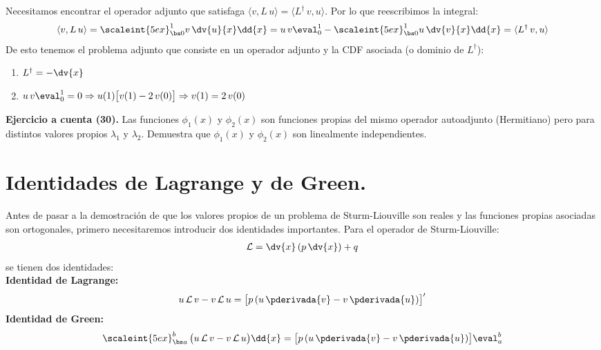 Necesitamos encontrar el operador adjunto que satisfaga \hfill \break $\langle v, L \, u \rangle = \langle L^{\dagger} \, v, u \rangle$. Por lo que reescribimos la integral:
\begin{align*}
\langle v, L \, u \rangle = \scaleint{5ex}_{\bs 0}^{1} v \, \dv{u}{x} \dd{x} = u \, v \eval_{0}^{1} - \scaleint{5ex}_{\bs 0}^{1} u \, \dv{v}{x} \dd{x} = \langle L^{\dagger} \, v, u \rangle
\end{align*}
De esto tenemos el problema adjunto que consiste en un operador adjunto y la CDF asociada (o dominio de $L^{\dagger}$):
\begin{enumerate}
\item $L^{\dagger} = - \dv{x}$
\item $\displaystyle u \, v \eval_{0}^{1} = 0 \Rightarrow u(1) \big[ v(1) - 2 \, v(0) \big] \Rightarrow v(1) = 2 \, v(0)$
\end{enumerate}
\vspace{0.3cm}
\noindent
\textbf{Ejercicio a cuenta (30).} Las funciones $\phi_{1}(x)$ y $\phi_{2}(x)$ son funciones propias del mismo operador autoadjunto (Hermitiano) pero para distintos valores propios $\lambda_{1}$ y $\lambda_{2}$. Demuestra que $\phi_{1}(x)$ y $\phi_{2}(x)$ son linealmente independientes.



\section{Identidades de Lagrange y de Green.}

Antes de pasar a la demostración de que los valores propios de un problema de Sturm-Liouville son reales y las funciones propias asociadas son ortogonales, primero necesitaremos introducir dos identidades importantes. Para el operador de Sturm-Liouville:
\begin{align*}
\mathcal{L} = \dv{x} \left( p \, \dv{x} \right) + q
\end{align*}
se tienen dos identidades:
\\
\noindent
\textbf{Identidad de Lagrange:} 
\begin{align*}
u \, \mathcal{L} \, v - v \, \mathcal{L} \, u = \big[ p \, (u \, \pderivada{v} - v \, \pderivada{u}) \big]^{\prime}
\end{align*}
\noindent
\textbf{Identidad de Green:} 
\begin{align*}
\scaleint{5ex}_{\bs a}^{b} \, \big(u \, \mathcal{L} \, v - v \, \mathcal{L} \, u \big) \dd{x} = \big[ p \, (u \, \pderivada{v} - v \, \pderivada{u}) \big]\eval_{a}^{b}
\end{align*}

